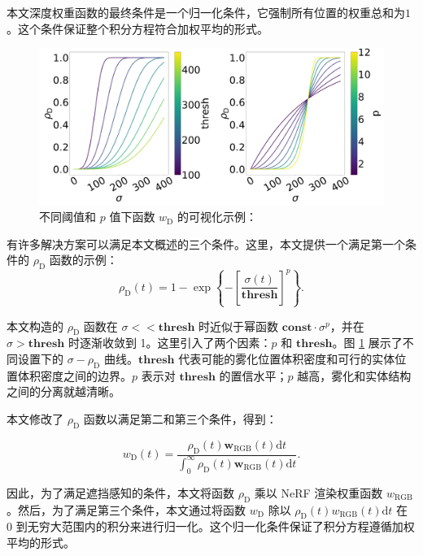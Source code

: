 本文深度权重函数的最终条件是一个归一化条件，它强制所有位置的权重总和为$1$。这个条件保证整个积分方程符合加权平均的形式。
\begin{figure}[ht]
    \centering
    \includegraphics[width=\textwidth]{undergraduate-thesis/images/dehazing-nerf/function-family.png}
    \caption{不同阈值和 $p$ 值下函数 $w_\text{D}$ 的可视化示例：}
    \label{fig:dehazing-nerf function-family}
\end{figure}
有许多解决方案可以满足本文概述的三个条件。这里，本文提供一个满足第一个条件的 $\rho_\text{D}$ 函数的示例：
\begin{equation}
    \rho_\text{D}(t) = 1 - \exp\left\{-\left[\frac{\sigma(t)}{\mathbf{thresh}}\right]^p\right\}.
\end{equation}

本文构造的 $\rho_\text{D}$ 函数在 $\sigma << \mathbf{thresh}$ 时近似于幂函数 $\mathbf{const}\cdot \sigma^p$，并在 $\sigma > \mathbf{thresh}$ 时逐渐收敛到 1。这里引入了两个因素：$p$ 和 $\mathbf{thresh}$。图 \ref{fig:dehazing-nerf function-family} 展示了不同设置下的 $\sigma-\rho_\text{D}$ 曲线。$\mathbf{thresh}$ 代表可能的雾化位置体积密度和可行的实体位置体积密度之间的边界。$p$ 表示对 $\mathbf{thresh}$ 的置信水平；$p$ 越高，雾化和实体结构之间的分离就越清晰。

本文修改了 $\rho_\text{D}$ 函数以满足第二和第三个条件，得到：

\begin{equation}
w_\text{D}(t) = \frac{\rho_\text{D}(t) \mathbf{w}_\text{RGB}(t)\text{d}t}{\int_0^\infty \rho_\text{D}(t) \mathbf{w}_\text{RGB}(t)\text{d}t}.
\end{equation}

因此，为了满足遮挡感知的条件，本文将函数 $\rho_\text{D}$ 乘以 NeRF 渲染权重函数 $w_\text{RGB}$。然后，为了满足第三个条件，本文通过将函数 $w_\text{D}$ 除以 $\rho_\text{D}(t) w_\text{RGB}(t)\text{d}t$ 在 0 到无穷大范围内的积分来进行归一化。这个归一化条件保证了积分方程遵循加权平均的形式。

